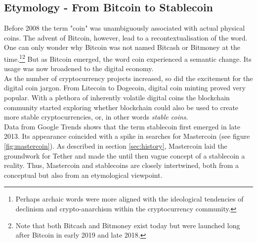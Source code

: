 \documentclass[conference]{IEEEtran}
\begin{document}
\subsection{Etymology - From Bitcoin to Stablecoin}
Before 2008 the term "coin" was unambiguously associated with actual physical coins. The advent of Bitcoin, however, lead to a recontextualisation of the word. One can only wonder why Bitcoin was not named Bitcash or Bitmoney at the time.\footnote{Perhaps archaic words were more aligned with the ideological tendencies of declinism and crypto-anarchism within the cryptocurrency community.}\footnote{Note that both Bitcash and Bitmoney exist today but were launched long after Bitcoin in early 2019 and late 2018.} But as Bitcoin emerged, the word coin experienced a semantic change. Its usage was now broadened to the digital economy.\\

As the number of cryptocurrency projects increased, so did the excitement for the digital coin jargon. From Litecoin to Dogecoin, digital coin minting proved very popular. With a plethora of inherently volatile digital coins the blockchain community started exploring whether blockchain could also be used to create more stable cryptocurrencies, or, in other words \emph{stable coins}.\\ %

Data from Google Trends shows that the term stablecoin first emerged in late 2013. Its appearance coincided with a spike in searches for Mastercoin (see figure \ref{fig:mastercoin}). As described in section \ref{sec:history}, Mastercoin laid the groundwork for Tether and made the until then vague concept of a stablecoin a reality. Thus, Mastercoin and stablecoins are closely intertwined, both from a conceptual but also from an etymological viewpoint.
\end{document}
